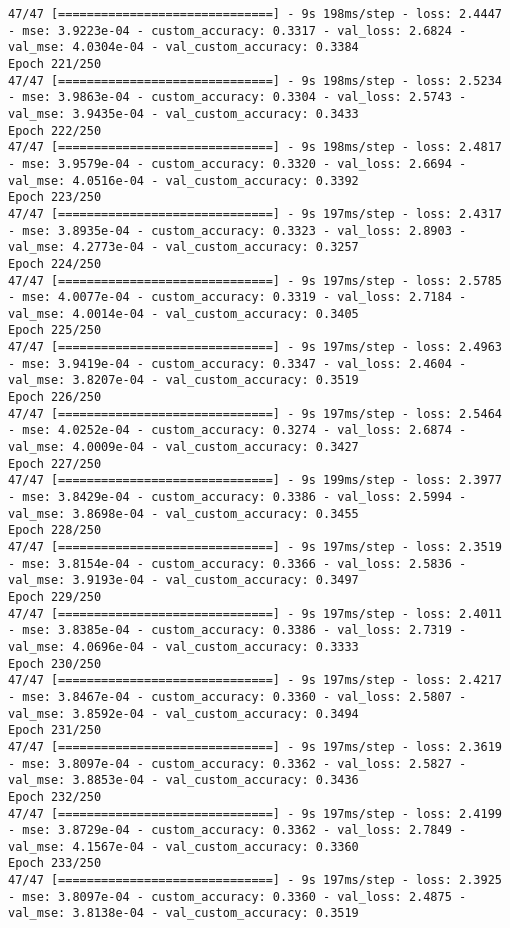 \begin{lstlisting}
47/47 [==============================] - 9s 198ms/step - loss: 2.4447 - mse: 3.9223e-04 - custom_accuracy: 0.3317 - val_loss: 2.6824 - val_mse: 4.0304e-04 - val_custom_accuracy: 0.3384
Epoch 221/250
47/47 [==============================] - 9s 198ms/step - loss: 2.5234 - mse: 3.9863e-04 - custom_accuracy: 0.3304 - val_loss: 2.5743 - val_mse: 3.9435e-04 - val_custom_accuracy: 0.3433
Epoch 222/250
47/47 [==============================] - 9s 198ms/step - loss: 2.4817 - mse: 3.9579e-04 - custom_accuracy: 0.3320 - val_loss: 2.6694 - val_mse: 4.0516e-04 - val_custom_accuracy: 0.3392
Epoch 223/250
47/47 [==============================] - 9s 197ms/step - loss: 2.4317 - mse: 3.8935e-04 - custom_accuracy: 0.3323 - val_loss: 2.8903 - val_mse: 4.2773e-04 - val_custom_accuracy: 0.3257
Epoch 224/250
47/47 [==============================] - 9s 197ms/step - loss: 2.5785 - mse: 4.0077e-04 - custom_accuracy: 0.3319 - val_loss: 2.7184 - val_mse: 4.0014e-04 - val_custom_accuracy: 0.3405
Epoch 225/250
47/47 [==============================] - 9s 197ms/step - loss: 2.4963 - mse: 3.9419e-04 - custom_accuracy: 0.3347 - val_loss: 2.4604 - val_mse: 3.8207e-04 - val_custom_accuracy: 0.3519
Epoch 226/250
47/47 [==============================] - 9s 197ms/step - loss: 2.5464 - mse: 4.0252e-04 - custom_accuracy: 0.3274 - val_loss: 2.6874 - val_mse: 4.0009e-04 - val_custom_accuracy: 0.3427
Epoch 227/250
47/47 [==============================] - 9s 199ms/step - loss: 2.3977 - mse: 3.8429e-04 - custom_accuracy: 0.3386 - val_loss: 2.5994 - val_mse: 3.8698e-04 - val_custom_accuracy: 0.3455
Epoch 228/250
47/47 [==============================] - 9s 197ms/step - loss: 2.3519 - mse: 3.8154e-04 - custom_accuracy: 0.3366 - val_loss: 2.5836 - val_mse: 3.9193e-04 - val_custom_accuracy: 0.3497
Epoch 229/250
47/47 [==============================] - 9s 197ms/step - loss: 2.4011 - mse: 3.8385e-04 - custom_accuracy: 0.3386 - val_loss: 2.7319 - val_mse: 4.0696e-04 - val_custom_accuracy: 0.3333
Epoch 230/250
47/47 [==============================] - 9s 197ms/step - loss: 2.4217 - mse: 3.8467e-04 - custom_accuracy: 0.3360 - val_loss: 2.5807 - val_mse: 3.8592e-04 - val_custom_accuracy: 0.3494
Epoch 231/250
47/47 [==============================] - 9s 197ms/step - loss: 2.3619 - mse: 3.8097e-04 - custom_accuracy: 0.3362 - val_loss: 2.5827 - val_mse: 3.8853e-04 - val_custom_accuracy: 0.3436
Epoch 232/250
47/47 [==============================] - 9s 197ms/step - loss: 2.4199 - mse: 3.8729e-04 - custom_accuracy: 0.3362 - val_loss: 2.7849 - val_mse: 4.1567e-04 - val_custom_accuracy: 0.3360
Epoch 233/250
47/47 [==============================] - 9s 197ms/step - loss: 2.3925 - mse: 3.8097e-04 - custom_accuracy: 0.3360 - val_loss: 2.4875 - val_mse: 3.8138e-04 - val_custom_accuracy: 0.3519

\end{lstlisting}
